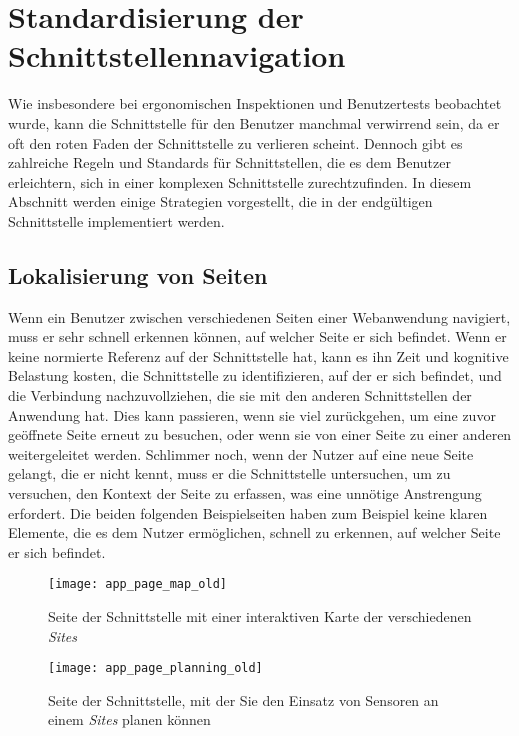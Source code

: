 \section{Standardisierung der Schnittstellennavigation} \label{sec:analyse-navigation}

Wie insbesondere bei ergonomischen Inspektionen und Benutzertests beobachtet wurde, kann die Schnittstelle für den Benutzer manchmal verwirrend sein, da er oft den roten Faden der Schnittstelle zu verlieren scheint.
Dennoch gibt es zahlreiche Regeln und Standards für Schnittstellen, die es dem Benutzer erleichtern, sich in einer komplexen Schnittstelle zurechtzufinden.
In diesem Abschnitt werden einige Strategien vorgestellt, die in der endgültigen Schnittstelle implementiert werden.

\subsection{Lokalisierung von Seiten}

Wenn ein Benutzer zwischen verschiedenen Seiten einer Webanwendung navigiert, muss er sehr schnell erkennen können, auf welcher Seite er sich befindet.
Wenn er keine normierte Referenz auf der Schnittstelle hat, kann es ihn Zeit und kognitive Belastung kosten, die Schnittstelle zu identifizieren, auf der er sich befindet, und die Verbindung nachzuvollziehen, die sie mit den anderen Schnittstellen der Anwendung hat.
Dies kann passieren, wenn sie viel zurückgehen, um eine zuvor geöffnete Seite erneut zu besuchen, oder wenn sie von einer Seite zu einer anderen weitergeleitet werden.
Schlimmer noch, wenn der Nutzer auf eine neue Seite gelangt, die er nicht kennt, muss er die Schnittstelle untersuchen, um zu versuchen, den Kontext der Seite zu erfassen, was eine unnötige Anstrengung erfordert.
Die beiden folgenden Beispielseiten haben zum Beispiel keine klaren Elemente, die es dem Nutzer ermöglichen, schnell zu erkennen, auf welcher Seite er sich befindet.

\begin{figure}[H]
  \centering
  \texttt{[image: app\_page\_map\_old]}
  \caption{Seite der Schnittstelle mit einer interaktiven Karte der verschiedenen \textit{Sites}}
  \label{fig:app_page_map_old}
\end{figure}
\begin{figure}[H]
  \centering
  \texttt{[image: app\_page\_planning\_old]}
  \caption{Seite der Schnittstelle, mit der Sie den Einsatz von Sensoren an einem \textit{Sites} planen können}
  \label{fig:app_page_planning_old}
\end{figure}


